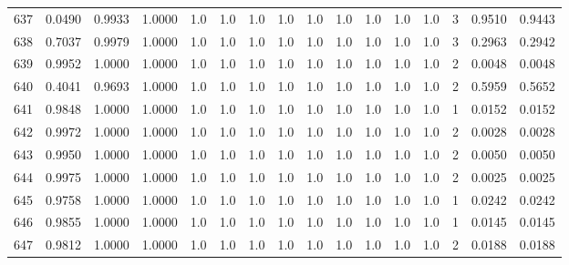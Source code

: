 \begin{tabular}{lrrrrrrrrrrrrrrr}
637 &      0.0490 &  0.9933 &  1.0000 &     1.0 &     1.0 &     1.0 &     1.0 &     1.0 &     1.0 &     1.0 &      1.0 &        1.0 &      3 &                    0.9510 &                     0.9443 \\
638 &      0.7037 &  0.9979 &  1.0000 &     1.0 &     1.0 &     1.0 &     1.0 &     1.0 &     1.0 &     1.0 &      1.0 &        1.0 &      3 &                    0.2963 &                     0.2942 \\
639 &      0.9952 &  1.0000 &  1.0000 &     1.0 &     1.0 &     1.0 &     1.0 &     1.0 &     1.0 &     1.0 &      1.0 &        1.0 &      2 &                    0.0048 &                     0.0048 \\
640 &      0.4041 &  0.9693 &  1.0000 &     1.0 &     1.0 &     1.0 &     1.0 &     1.0 &     1.0 &     1.0 &      1.0 &        1.0 &      2 &                    0.5959 &                     0.5652 \\
641 &      0.9848 &  1.0000 &  1.0000 &     1.0 &     1.0 &     1.0 &     1.0 &     1.0 &     1.0 &     1.0 &      1.0 &        1.0 &      1 &                    0.0152 &                     0.0152 \\
642 &      0.9972 &  1.0000 &  1.0000 &     1.0 &     1.0 &     1.0 &     1.0 &     1.0 &     1.0 &     1.0 &      1.0 &        1.0 &      2 &                    0.0028 &                     0.0028 \\
643 &      0.9950 &  1.0000 &  1.0000 &     1.0 &     1.0 &     1.0 &     1.0 &     1.0 &     1.0 &     1.0 &      1.0 &        1.0 &      2 &                    0.0050 &                     0.0050 \\
644 &      0.9975 &  1.0000 &  1.0000 &     1.0 &     1.0 &     1.0 &     1.0 &     1.0 &     1.0 &     1.0 &      1.0 &        1.0 &      2 &                    0.0025 &                     0.0025 \\
645 &      0.9758 &  1.0000 &  1.0000 &     1.0 &     1.0 &     1.0 &     1.0 &     1.0 &     1.0 &     1.0 &      1.0 &        1.0 &      1 &                    0.0242 &                     0.0242 \\
646 &      0.9855 &  1.0000 &  1.0000 &     1.0 &     1.0 &     1.0 &     1.0 &     1.0 &     1.0 &     1.0 &      1.0 &        1.0 &      1 &                    0.0145 &                     0.0145 \\
647 &      0.9812 &  1.0000 &  1.0000 &     1.0 &     1.0 &     1.0 &     1.0 &     1.0 &     1.0 &     1.0 &      1.0 &        1.0 &      2 &                    0.0188 &                     0.0188 \\

\end{tabular}
